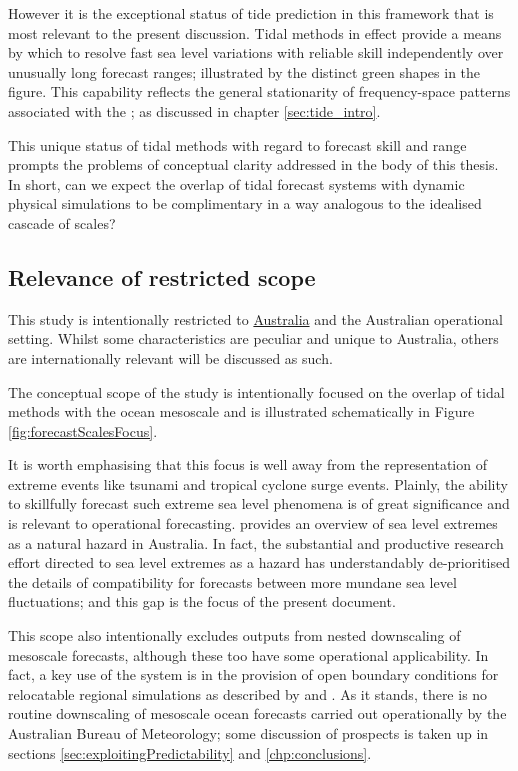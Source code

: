 However it is the exceptional status of tide prediction in this framework that is most relevant to the present discussion.  Tidal methods in effect provide a means by which to resolve fast sea level variations with reliable skill independently over unusually long forecast ranges; illustrated by the distinct green shapes in the figure.    This capability reflects the general stationarity of frequency-space patterns associated with the \ATGP{}; as discussed in chapter \ref{sec:tide_intro}.

This unique status of tidal methods with regard to forecast skill and range prompts the problems of conceptual clarity addressed in the body of this thesis.  In short, can we expect the overlap of tidal forecast systems with dynamic physical simulations to be complimentary in a way analogous to the idealised cascade of scales?
\subsection{Relevance of restricted scope}
This study is intentionally restricted to \underline{Australia} and the Australian operational setting.  Whilst some characteristics are peculiar and unique to Australia, others are internationally relevant will be discussed as such.


The conceptual scope of the study is intentionally focused on the overlap of tidal methods with the ocean mesoscale and is illustrated schematically in Figure \ref{fig:forecastScalesFocus}.


It is worth emphasising that this focus is well away from the representation of extreme events like tsunami and tropical cyclone surge events.   Plainly, the ability to skillfully forecast such extreme sea level phenomena is of great significance and is relevant to operational forecasting. \citet{McInnes:2016km} provides an overview of sea level extremes as a natural hazard in Australia.    
In fact, the substantial and productive research effort directed to sea level extremes as a hazard has understandably de-prioritised the details of compatibility for forecasts between more mundane sea level fluctuations; and this gap is the focus of the present document. 

This scope also intentionally excludes outputs from nested downscaling of mesoscale forecasts, although these too have some operational applicability.   In fact, a key use of the  \BL{} system is in the provision of open boundary conditions for relocatable regional simulations as described by \citep{10.1080/1755876x.2019.1685834} and \citep{10.1007/978-3-319-15994-2_23}.  As it stands, there is no routine downscaling of mesoscale ocean forecasts carried out operationally by the Australian Bureau of Meteorology; some discussion of prospects is taken up in sections \ref{sec:exploitingPredictability} and  \ref{chp:conclusions}. 

